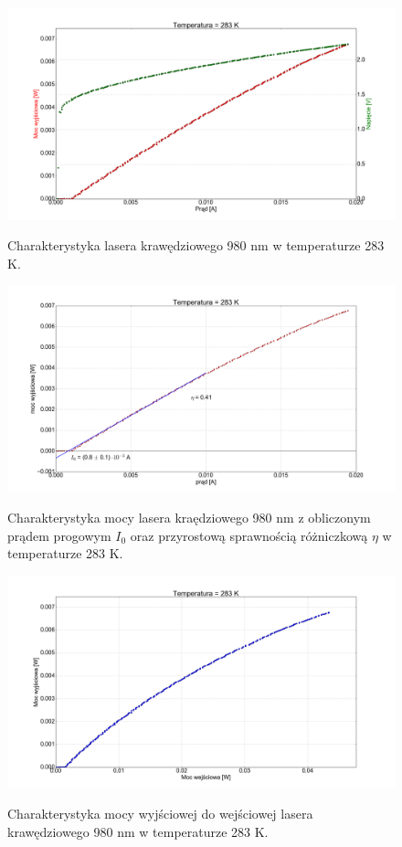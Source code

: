 \documentclass[a4paper, portrait,12pt]{report}
\begin{document}
\newpage
\begin{figure}
\center
  \includegraphics[scale=0.30]{plot980/temp_10_IVL.png}
  \label{rys1}
  \caption{Charakterystyka lasera krawędziowego 980 nm w temperaturze 283 K.} 
\end{figure}

\begin{figure}
\center
  \includegraphics[scale=0.30]{plot980/temp_10_fit.png}
  \label{rys1}
  \caption{Charakterystyka mocy lasera kraędziowego 980 nm z obliczonym prądem progowym $I_0$ oraz przyrostową sprawnością różniczkową $\eta$ w temperaturze 283 K.} 
\end{figure}

\begin{figure}
\center
  \includegraphics[scale=0.30]{plot980/temp_10_power.png}
  \label{rys1}
  \caption{Charakterystyka mocy wyjściowej do wejściowej lasera krawędziowego 980 nm w temperaturze 283 K.} 
\end{figure}
\end{document}
